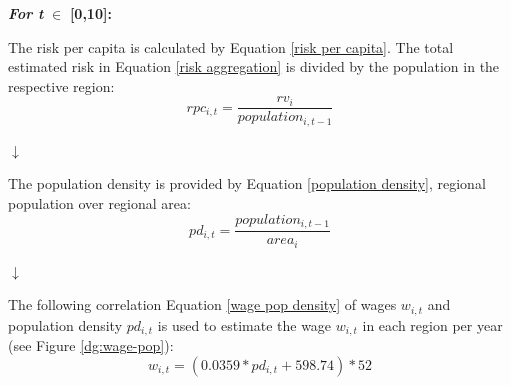 \documentclass[10pt,a4paper]{article}
\begin{document}
\begin{center}
\textbf{\textit{For t }}$\in$ \textbf{[0,10]:}\vspace{.5cm}


The risk per capita is calculated by Equation \ref{risk per capita}. The total estimated risk in Equation \ref{risk aggregation} is divided by the population in the respective region:
\begin{equation}
    rpc_{i,t} = \frac{rv_{i}}{population_{i,t-1}}
    \label{risk per capita}
\end{equation}

\begin{center}
    $\downarrow$
\end{center}
The population density is provided by Equation \ref{population density}, regional population over regional area:
\begin{equation}
    pd_{i,t} = \frac{population_{i,t-1}}{area_i}
    \label{population density}
\end{equation}

\begin{center}
    $\downarrow$
\end{center}
The following correlation Equation \ref{wage pop density} of wages $w_{i,t}$ and population density $pd_{i,t}$ is used to estimate the wage $w_{i,t}$ in each region per year (see Figure \ref{dg:wage-pop}):
\begin{equation}
    w_{i,t} = (0.0359*pd_{i,t}+598.74) * 52
    \label{wage pop density}
\end{equation}



\end{center}
\end{document}
